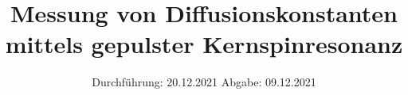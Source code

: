 
\setlength\parindent{0pt}
\subject{V49}
\title{Messung von Diffusionskonstanten mittels gepulster Kernspinresonanz}
\date{%
  Durchführung: 20.12.2021
  \hspace{3em}
  Abgabe: 09.12.2021 \\
}



\maketitle
\thispagestyle{empty}
\tableofcontents
\newpage







\newpage
\nocite{*}
\printbibliography
\appendix


